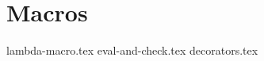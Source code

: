 \documentclass{exam}
\begin{document}
\section{Macros}
\begin{questions}
{lambda-macro.tex}
{eval-and-check.tex}
{decorators.tex}
\end{questions}

\end{document}
